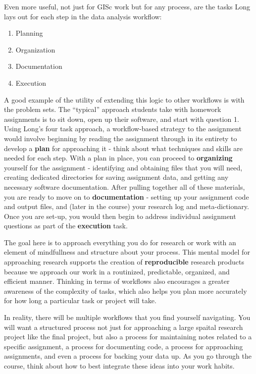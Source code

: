 \documentclass[]{book}
\providecommand{\tightlist}{%
  \setlength{\itemsep}{0pt}\setlength{\parskip}{0pt}}
\begin{document}
Even more useful, not just for GISc work but for any process, are the
tasks Long lays out for each step in the data analysis workflow:

\begin{enumerate}
\def\labelenumi{\arabic{enumi}.}
\tightlist
\item
  Planning
\item
  Organization
\item
  Documentation
\item
  Execution
\end{enumerate}

A good example of the utility of extending this logic to other workflows
is with the problem sets. The ``typical'' approach students take with
homework assignments is to sit down, open up their software, and start
with question 1. Using Long's four task approach, a workflow-based
strategy to the assignment would involve beginning by reading the
assignment through in its entirety to develop a \textbf{plan} for
approaching it - think about what techniques and skills are needed for
each step. With a plan in place, you can proceed to \textbf{organizing}
yourself for the assignment - identifying and obtaining files that you
will need, creating dedicated directories for saving assignment data,
and getting any necessary software documentation. After pulling together
all of these materials, you are ready to move on to
\textbf{documentation} - setting up your assignment code and output
files, and (later in the course) your research log and meta-dictionary.
Once you are set-up, you would then begin to address individual
assignment questions as part of the \textbf{execution} task.

The goal here is to approach everything you do for research or work with
an element of mindfullness and structure about your process. This mental
model for approaching research supports the creation of
\textbf{reproducible} research products because we approach our work in
a routinized, predictable, organized, and efficient manner. Thinking in
terms of workflows also encourages a greater awareness of the complexity
of tasks, which also helps you plan more accurately for how long a
particular task or project will take.

In reality, there will be multiple workflows that you find yourself
navigating. You will want a structured process not just for approaching
a large spaital research project like the final project, but also a
process for maintaining notes related to a specific assignment, a
process for documenting code, a process for approaching assignments, and
even a process for backing your data up. As you go through the course,
think about how to best integrate these ideas into your work habits.
\end{document}
